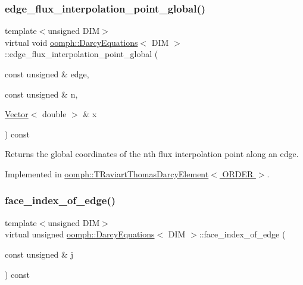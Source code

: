 \subsubsection{\texorpdfstring{edge\+\_\+flux\+\_\+interpolation\+\_\+point\+\_\+global()}{edge\_flux\_interpolation\_point\_global()}\hspace{0.1cm}{\footnotesize\ttfamily [2/2]}}
{\footnotesize\ttfamily template$<$unsigned D\+IM$>$ \\
virtual void \hyperlink{classoomph_1_1DarcyEquations}{oomph\+::\+Darcy\+Equations}$<$ D\+IM $>$\+::edge\+\_\+flux\+\_\+interpolation\+\_\+point\+\_\+global (\begin{DoxyParamCaption}\item[{const unsigned \&}]{edge,  }\item[{const unsigned \&}]{n,  }\item[{\hyperlink{classoomph_1_1Vector}{Vector}$<$ double $>$ \&}]{x }\end{DoxyParamCaption}) const\hspace{0.3cm}{\ttfamily [pure virtual]}}



Returns the global coordinates of the nth flux interpolation point along an edge. 



Implemented in \hyperlink{classoomph_1_1TRaviartThomasDarcyElement_a39394c7bd6d9517135f2befcd5e7d646}{oomph\+::\+T\+Raviart\+Thomas\+Darcy\+Element$<$ O\+R\+D\+E\+R $>$}.

\mbox{\label{classoomph_1_1DarcyEquations_ae1ab5c1d06efe95dfd2db523c6f34eb9}} 
\subsubsection{\texorpdfstring{face\+\_\+index\+\_\+of\+\_\+edge()}{face\_index\_of\_edge()}}
{\footnotesize\ttfamily template$<$unsigned D\+IM$>$ \\
virtual unsigned \hyperlink{classoomph_1_1DarcyEquations}{oomph\+::\+Darcy\+Equations}$<$ D\+IM $>$\+::face\+\_\+index\+\_\+of\+\_\+edge (\begin{DoxyParamCaption}\item[{const unsigned \&}]{j }\end{DoxyParamCaption}) const\hspace{0.3cm}{\ttfamily [pure virtual]}}




